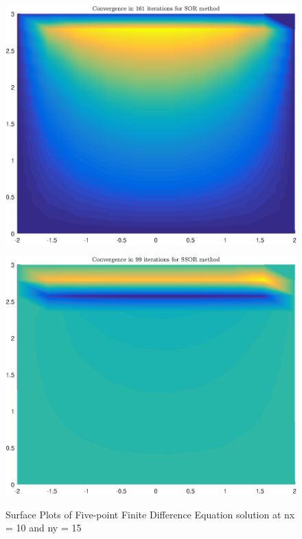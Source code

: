 \documentclass[11pt]{article}
\begin{document}
\begin{figure}
\\
\begin{minipage}{.45\textwidth}
\centering
\includegraphics[width=\linewidth]{math609_pa3_comp_example_2_104_n_SOR.eps}
\label{fig:test3}
\end{minipage}\hfill
\begin{minipage}{.45\textwidth}
\centering
\includegraphics[width=\linewidth]{math609_pa3_comp_example_2_104_n_SSOR.eps}
\label{fig:test3}
\end{minipage}\hfill
\caption{Surface Plots of Five-point Finite Difference Equation solution at nx = 10 and ny = 15}
\end{figure}
\end{document}
